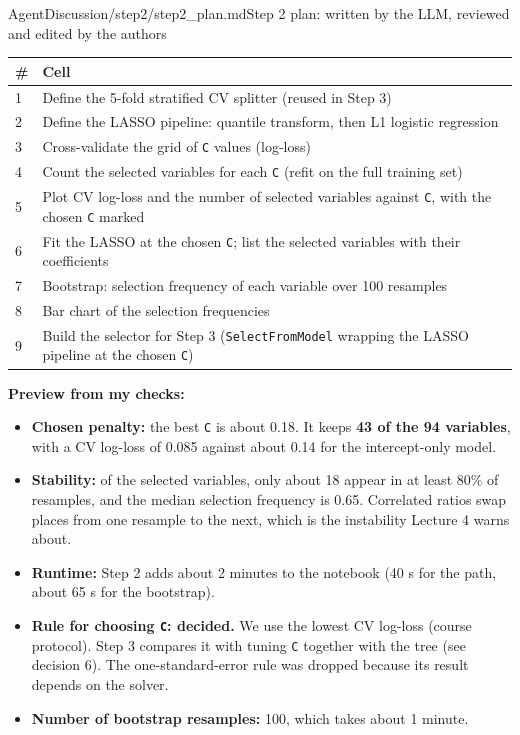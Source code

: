 \begin{mdfile}{AgentDiscussion/\allowbreak{}step2/\allowbreak{}step2\_plan.md}{Step 2 plan: written by the LLM, reviewed and edited by the authors}
{\def\LTcaptype{none} %
\begin{tabularx}{\linewidth}{@{}l>{\raggedright\arraybackslash}X@{}}
\toprule\noalign{}
\# & Cell \\
\midrule\noalign{}
1 & Define the 5-fold stratified CV splitter (reused in Step 3) \\
2 & Define the LASSO pipeline: quantile transform, then L1 logistic regression \\
3 & Cross-validate the grid of \texttt{C} values (log-loss) \\
4 & Count the selected variables for each \texttt{C} (refit on the full training set) \\
5 & Plot CV log-loss and the number of selected variables against \texttt{C}, with the chosen \texttt{C} marked \\
6 & Fit the LASSO at the chosen \texttt{C}; list the selected variables with their coefficients \\
7 & Bootstrap: selection frequency of each variable over 100 resamples \\
8 & Bar chart of the selection frequencies \\
9 & Build the selector for Step 3 (\texttt{SelectFromModel} wrapping the LASSO pipeline at the chosen \texttt{C}) \\
\bottomrule
\end{tabularx}
}

\textbf{Preview from my checks:}

\begin{itemize}
\tightlist
\item
  \textbf{Chosen penalty:} the best \texttt{C} is about 0.18. It keeps \textbf{43 of the 94 variables}, with a CV log-loss of 0.085 against about 0.14 for the intercept-only model.
\item
  \textbf{Stability:} of the selected variables, only about 18 appear in at least 80\% of resamples, and the median selection frequency is 0.65. Correlated ratios swap places from one resample to the next, which is the instability Lecture 4 warns about.
\item
  \textbf{Runtime:} Step 2 adds about 2 minutes to the notebook (40 s for the path, about 65 s for the bootstrap).
\end{itemize}


\begin{itemize}
\tightlist
\item
  \textbf{Rule for choosing \texttt{C}: decided.} We use the lowest CV log-loss (course protocol). Step 3 compares it with tuning \texttt{C} together with the tree (see decision 6). The one-standard-error rule was dropped because its result depends on the solver.
\item
  \textbf{Number of bootstrap resamples:} 100, which takes about 1 minute.
\end{itemize}
\end{mdfile}


